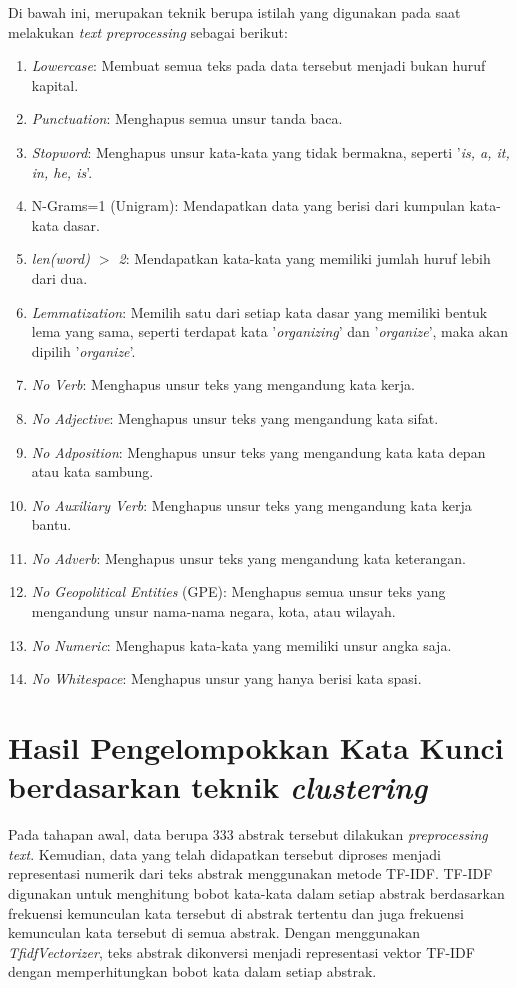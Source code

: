 Di bawah ini, merupakan teknik berupa istilah yang digunakan pada saat melakukan \textit{text preprocessing} sebagai berikut:
\begin{enumerate}
    \item \textit{Lowercase}: Membuat semua teks pada data tersebut menjadi bukan huruf kapital.
    \item \textit{Punctuation}: Menghapus semua unsur tanda baca.
    \item \textit{Stopword}: Menghapus unsur kata-kata yang tidak bermakna, seperti '\textit{is, a, it, in, he, is}'.
    \item N-Grams=1 (Unigram): Mendapatkan data yang berisi dari kumpulan kata-kata dasar.
    \item \textit{len(word) $>$ 2}: Mendapatkan kata-kata yang memiliki jumlah huruf lebih dari dua.
    \item \textit{Lemmatization}: Memilih satu dari setiap kata dasar yang memiliki bentuk lema yang sama, seperti terdapat kata '\textit{organizing}' dan '\textit{organize}', maka akan dipilih '\textit{organize}'.
    \item \textit{No Verb}: Menghapus unsur teks yang mengandung kata kerja.
    \item \textit{No Adjective}: Menghapus unsur teks yang mengandung kata sifat.
    \item \textit{No Adposition}: Menghapus unsur teks yang mengandung kata kata depan atau kata sambung.
    \item \textit{No Auxiliary Verb}: Menghapus unsur teks yang mengandung kata kerja bantu.
    \item \textit{No Adverb}: Menghapus unsur teks yang mengandung kata keterangan.
    \item \textit{No Geopolitical Entities} (GPE): Menghapus semua unsur teks yang mengandung unsur nama-nama negara, kota, atau wilayah.
    \item \textit{No Numeric}: Menghapus kata-kata yang memiliki unsur angka saja.
    \item \textit{No Whitespace}: Menghapus unsur yang hanya berisi kata spasi.
\end{enumerate}

\section{Hasil Pengelompokkan Kata Kunci berdasarkan teknik \textit{clustering}}
Pada tahapan awal, data berupa 333 abstrak tersebut dilakukan \textit{preprocessing text}. Kemudian, data yang telah didapatkan tersebut diproses menjadi representasi numerik dari teks abstrak menggunakan metode TF-IDF. TF-IDF digunakan untuk menghitung bobot kata-kata dalam setiap abstrak berdasarkan frekuensi kemunculan kata tersebut di abstrak tertentu dan juga frekuensi kemunculan kata tersebut di semua abstrak. Dengan menggunakan \textit{TfidfVectorizer}, teks abstrak dikonversi menjadi representasi vektor TF-IDF dengan memperhitungkan bobot kata dalam setiap abstrak.


